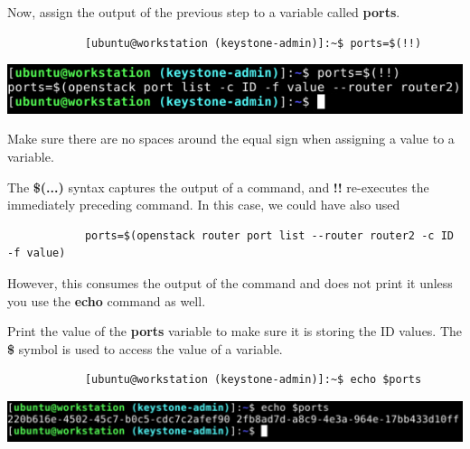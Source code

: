 \documentclass[letterpaper, 12pt]{article}
\begin{document}
\begin{enumerate}
    \begin{labstep}
        Now, assign the output of the previous step to a variable called \textbf{ports}.
        \begin{lstlisting}
            [ubuntu@workstation (keystone-admin)]:~$ ports=$(!!)
        \end{lstlisting}

        \begin{center}
            \includegraphics[width=\linewidth]{images/part4/step5.png}
        \end{center}
    \end{labstep}

    \begin{tipbox}
        Make sure there are no spaces around the equal sign when assigning a value to a variable.
    \end{tipbox}
    \begin{notebox}
        The \textbf{\$(...)} syntax captures the output of a command, and \textbf{!!} re-executes the immediately preceding command. %
        In this case, we could have also used
        \begin{lstlisting}
            ports=$(openstack router port list --router router2 -c ID -f value)
        \end{lstlisting}
        However, this consumes the output of the command and does not print it unless you use the \textbf{echo} command as well.
    \end{notebox}

    \begin{labstep}
        Print the value of the \textbf{ports} variable to make sure it is storing the ID values.
        The \textbf{\$} symbol is used to access the value of a variable.
        \begin{lstlisting}
            [ubuntu@workstation (keystone-admin)]:~$ echo $ports
        \end{lstlisting}

        \begin{center}
            \includegraphics[width=\linewidth]{images/part4/step6.png}
        \end{center}
    \end{labstep}


\end{enumerate}
\end{document}
